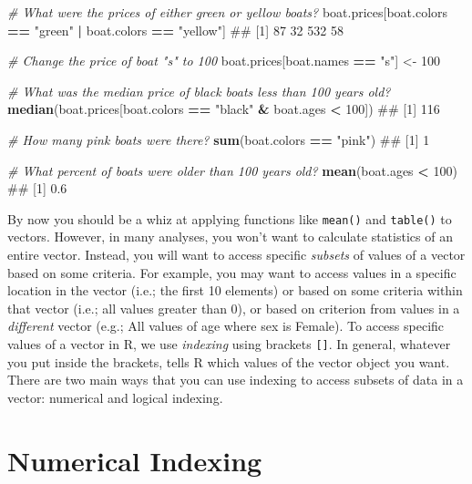 \documentclass[]{book}
\newenvironment{Shaded}{\begin{snugshade}}{\end{snugshade}}
\newcommand{\KeywordTok}[1]{\textcolor[rgb]{0.13,0.29,0.53}{\textbf{#1}}}
\newcommand{\DecValTok}[1]{\textcolor[rgb]{0.00,0.00,0.81}{#1}}
\newcommand{\StringTok}[1]{\textcolor[rgb]{0.31,0.60,0.02}{#1}}
\newcommand{\CommentTok}[1]{\textcolor[rgb]{0.56,0.35,0.01}{\textit{#1}}}
\newcommand{\OperatorTok}[1]{\textcolor[rgb]{0.81,0.36,0.00}{\textbf{#1}}}
\newcommand{\NormalTok}[1]{#1}
\theoremstyle{definition}
\theoremstyle{definition}
\theoremstyle{remark}
\begin{document}
\begin{Shaded}
\begin{Highlighting}[]
\CommentTok{# What were the prices of either green or yellow boats?}
\NormalTok{boat.prices[boat.colors }\OperatorTok{==}\StringTok{ "green"} \OperatorTok{|}\StringTok{ }\NormalTok{boat.colors }\OperatorTok{==}\StringTok{ "yellow"}\NormalTok{]}
\NormalTok{## [1]  87  32 532  58}

\CommentTok{# Change the price of boat "s" to 100}
\NormalTok{boat.prices[boat.names }\OperatorTok{==}\StringTok{ "s"}\NormalTok{] <-}\StringTok{ }\DecValTok{100}

\CommentTok{# What was the median price of black boats less than 100 years old?}
\KeywordTok{median}\NormalTok{(boat.prices[boat.colors }\OperatorTok{==}\StringTok{ "black"} \OperatorTok{&}\StringTok{ }\NormalTok{boat.ages }\OperatorTok{<}\StringTok{ }\DecValTok{100}\NormalTok{])}
\NormalTok{## [1] 116}

\CommentTok{# How many pink boats were there?}
\KeywordTok{sum}\NormalTok{(boat.colors }\OperatorTok{==}\StringTok{ "pink"}\NormalTok{)}
\NormalTok{## [1] 1}

\CommentTok{# What percent of boats were older than 100 years old?}
\KeywordTok{mean}\NormalTok{(boat.ages }\OperatorTok{<}\StringTok{ }\DecValTok{100}\NormalTok{)}
\NormalTok{## [1] 0.6}
\end{Highlighting}
\end{Shaded}

By now you should be a whiz at applying functions like \texttt{mean()}
and \texttt{table()} to vectors. However, in many analyses, you won't
want to calculate statistics of an entire vector. Instead, you will want
to access specific \emph{subsets} of values of a vector based on some
criteria. For example, you may want to access values in a specific
location in the vector (i.e.; the first 10 elements) or based on some
criteria within that vector (i.e.; all values greater than 0), or based
on criterion from values in a \emph{different} vector (e.g.; All values
of age where sex is Female). To access specific values of a vector in R,
we use \emph{indexing} using brackets \texttt{{[}{]}}. In general,
whatever you put inside the brackets, tells R which values of the vector
object you want. There are two main ways that you can use indexing to
access subsets of data in a vector: numerical and logical indexing.

\section{Numerical Indexing}\label{numerical-indexing}
\end{document}
